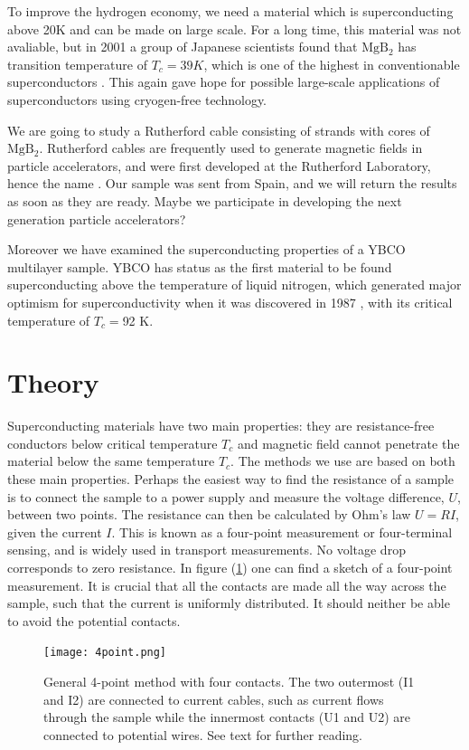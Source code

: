 \documentclass{comjnl}
\newcommand*\chem[1]{\ensuremath{\mathrm{#1}}}
\begin{document}
To improve the hydrogen economy, we need a material which is superconducting above 20K and can be made on large scale. For a long time, this material was not avaliable, but in 2001 a group of Japanese scientists found that \chem{MgB_2} has transition temperature of $T_c=39K$, which is one of the highest in conventionable superconductors \cite {jsap}\cite {nature}. This again gave hope for possible large-scale applications of superconductors using cryogen-free technology. 

We are going to study a Rutherford cable consisting of strands with cores of \chem{MgB_2}. Rutherford cables are frequently used to generate magnetic fields in particle accelerators, and were first developed at the Rutherford Laboratory, hence the name \cite {fnal}. Our sample was sent from Spain, and we will return the results as soon as they are ready. Maybe we participate in developing the next generation particle accelerators?

Moreover we have examined the superconducting properties of a YBCO multilayer sample. YBCO has status as the first material to be found superconducting above the temperature of liquid nitrogen, which generated major optimism for superconductivity when it was discovered in 1987 \cite{harvard}, with its critical temperature of $T_c=$92 K. 

\section{Theory}\label{Sec:Theory}
Superconducting materials have two main properties: they are resistance-free conductors below critical temperature $T_c$ and magnetic field cannot penetrate the material below the same temperature $T_c$. The methods we use are based on both these main properties. Perhaps the easiest way to find the resistance of a sample is to connect the sample to a power supply and measure the voltage difference, $U$, between two points. The resistance can then be calculated by Ohm's law $U=RI$, given the current $I$. This is known as a four-point measurement or four-terminal sensing, and is widely used in transport measurements. No voltage drop corresponds to zero resistance. In figure (\ref{fig:4point}) one can find a sketch of a four-point measurement. It is crucial that all the contacts are made all the way across the sample, such that the current is uniformly distributed. It should neither be able to avoid the potential contacts.
\begin{figure}[h]
\centering
\texttt{[image: 4point.png]}
\caption{General 4-point method with four contacts. The two outermost (I1 and I2) are connected to current cables, such as current flows through the sample while the innermost contacts (U1 and U2) are connected to potential wires. See text for further reading. \label{fig:4point}}
\end{figure}
\end{document}
